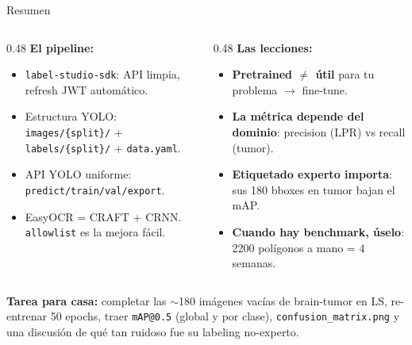 \begin{frame}[shrink]{Resumen}
  \vspace{6pt}
  \begin{columns}[T]
    \begin{column}{0.48\textwidth}
      {\footnotesize\bfseries\color{arcaDark} El pipeline:}
      \vspace{4pt}

      {\scriptsize
      \begin{itemize}\setlength{\itemsep}{4pt}
        \item \texttt{label-studio-sdk}: API limpia, refresh JWT autom\'atico.
        \item Estructura YOLO: \texttt{images/\{split\}/} + \texttt{labels/\{split\}/} + \texttt{data.yaml}.
        \item API YOLO uniforme: \texttt{predict/train/val/export}.
        \item EasyOCR = CRAFT + CRNN. \texttt{allowlist} es la mejora f\'acil.
      \end{itemize}
      }
    \end{column}
    \begin{column}{0.48\textwidth}
      {\footnotesize\bfseries\color{arcaDark} Las lecciones:}
      \vspace{4pt}

      {\scriptsize
      \begin{itemize}\setlength{\itemsep}{4pt}
        \item \textbf{Pretrained $\neq$ \'util} para tu problema $\to$ fine-tune.
        \item \textbf{La m\'etrica depende del dominio}: precision (LPR) vs recall (tumor).
        \item \textbf{Etiquetado experto importa}: sus 180 bboxes en tumor bajan el mAP.
        \item \textbf{Cuando hay benchmark, \'uselo}: 2200 pol\'igonos a mano = 4 semanas.
      \end{itemize}
      }
    \end{column}
  \end{columns}

  \vspace{12pt}
  \begin{tcolorbox}[colback=codeGreen!8, colframe=codeGreen, boxrule=0.5pt,
    arc=2pt, left=6pt, right=6pt, top=4pt, bottom=4pt]
    {\scriptsize\color{arcaDark}
    \faKey\hspace{4pt}\textbf{Tarea para casa:} completar las $\sim$180
    im\'agenes vac\'ias de brain-tumor en LS, re-entrenar 50 epochs,
    traer \texttt{mAP@0.5} (global y por clase), \texttt{confusion\_matrix.png}
    y una discusi\'on de qu\'e tan ruidoso fue su labeling no-experto.}
  \end{tcolorbox}
\end{frame}

